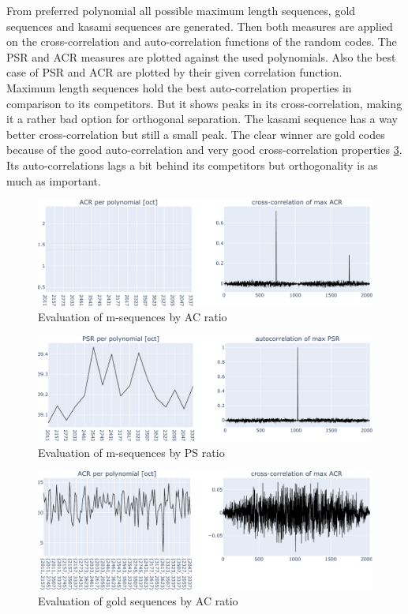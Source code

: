 From preferred polynomial all possible maximum length sequences, gold sequences and kasami sequences are generated. Then both measures are applied on the cross-correlation and auto-correlation functions of the random codes. The PSR and ACR measures are plotted against the used polynomials. Also the best case of PSR and ACR are plotted by their given correlation function.\\
Maximum length sequences hold the best auto-correlation properties in comparison to its competitors. But it shows peaks in its cross-correlation, making it a rather bad option for orthogonal separation. The kasami sequence has a way better cross-correlation but still a small peak. The clear winner are gold codes because of the good auto-correlation and very good cross-correlation properties \ref{fig:eva}. Its auto-correlations lags a bit behind its competitors but orthogonality is as much as important. 

\begin{figure}[h]
	\centering\includegraphics[width=13.5cm]{images/mseqevaacr}
	
	\caption{Evaluation of m-sequences by AC ratio}
	\label{fig:eva}
\end{figure}

\begin{figure}[h]
	\centering\includegraphics[width=13.5cm]{images/mseqevapsr}
	
	\caption{Evaluation of m-sequences by PS ratio}
	\label{fig:eva}
\end{figure}

\begin{figure}[h]
	\centering\includegraphics[width=13.5cm]{images/goldevaacr}
	
	\caption{Evaluation of gold sequences by AC ratio}
	\label{fig:eva}
\end{figure}

